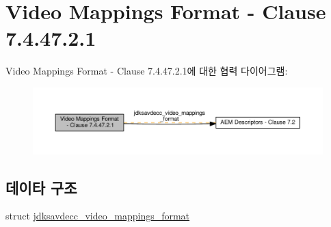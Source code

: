\hypertarget{group__video__mappings__format}{}\section{Video Mappings Format -\/ Clause 7.4.47.2.1}
\label{group__video__mappings__format}
Video Mappings Format -\/ Clause 7.4.47.2.1에 대한 협력 다이어그램\+:
\nopagebreak
\begin{figure}[H]
\begin{center}
\leavevmode
\includegraphics[width=350pt]{group__video__mappings__format}
\end{center}
\end{figure}
\subsection*{데이타 구조}
\begin{DoxyCompactItemize}
\item 
struct \hyperlink{structjdksavdecc__video__mappings__format}{jdksavdecc\+\_\+video\+\_\+mappings\+\_\+format}
\end{DoxyCompactItemize}
